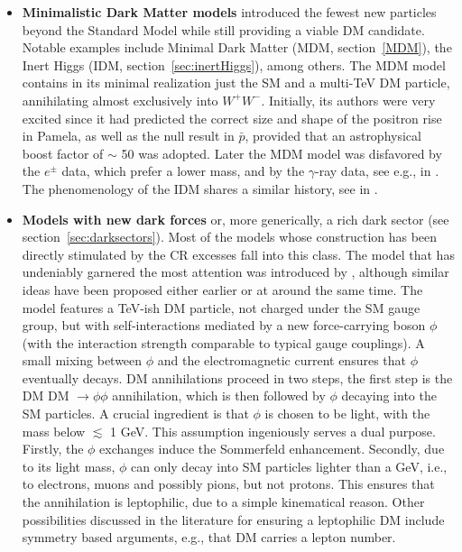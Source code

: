 \begin{itemize}

\item[$\diamond$] {\bf Minimalistic Dark Matter models} introduced the fewest new particles beyond the Standard Model while still providing a viable DM candidate.
Notable examples include Minimal Dark Matter (MDM, section~\ref{MDM}), the Inert Higgs (IDM, section~\ref{sec:inertHiggs}), among others. The MDM model contains in its minimal realization just the SM and a multi-TeV DM particle, annihilating almost exclusively into $W^+W^-$. Initially, its authors were very excited since it had predicted the correct size and shape of the positron rise in {\sc Pamela}, as well as the null result in $\bar p$, provided that an astrophysical boost factor of $\sim$ 50 was adopted. Later the MDM model was disfavored by the $e^\pm$ data, which prefer a lower mass, and by the $\gamma$-ray data, see e.g.,  in \cite{positronexcessbounds}. 
The phenomenology of the IDM shares a similar history, see  in \cite{positronexcessmodels}.

\item[$\diamond$] {\bf Models with new dark forces} or, more generically, a rich dark sector (see section~\ref{sec:darksectors}). Most of the models whose construction has been directly stimulated by the CR excesses fall into this class. 
The model that has undeniably garnered the most attention 
was introduced by  \cite{positronexcessmodels}, although similar ideas have been proposed either earlier or at around the same time. The model features a TeV-ish DM particle, not charged under the SM gauge group, but with self-interactions mediated by a new force-carrying boson $\phi$ (with the interaction strength comparable to typical gauge couplings). A small mixing between $\phi$ and the electromagnetic current ensures that $\phi$ eventually decays. DM annihilations proceed in two steps, the first step is the DM DM $\to \phi \phi$ annihilation, which is then followed by $\phi$ decaying into the SM particles. 
A crucial ingredient is that $\phi$ is chosen to be light, with the mass below $\lesssim$ 1 GeV. 
This assumption ingeniously serves a dual purpose. Firstly, the $\phi$ exchanges induce the Sommerfeld enhancement. Secondly, due to its light mass, $\phi$ can only decay into SM particles lighter than a GeV, i.e., to electrons, muons and possibly pions, but not protons. This ensures that the annihilation is leptophilic, due to a simple kinematical reason. Other possibilities discussed in the literature  for ensuring a leptophilic DM include symmetry based arguments, e.g., that DM carries a lepton number. 



\end{itemize}
